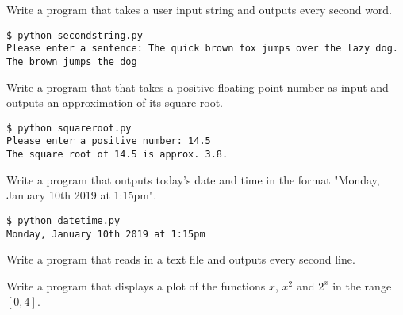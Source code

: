 \documentclass[a4paper, 12pt]{exam}
\begin{document}
\begin{questions}
    \question
    Write a program that takes a user input string and outputs every second word.
    \begin{verbatim}
$ python secondstring.py
Please enter a sentence: The quick brown fox jumps over the lazy dog.
The brown jumps the dog
    \end{verbatim}

    \question
    Write a program that that takes a positive floating point number as input and outputs an approximation of its square root.
    \begin{verbatim}
$ python squareroot.py
Please enter a positive number: 14.5
The square root of 14.5 is approx. 3.8.
    \end{verbatim}

    \question
    Write a program that outputs today's date and time in the format "Monday, January 10th 2019 at 1:15pm".
    \begin{verbatim}
$ python datetime.py
Monday, January 10th 2019 at 1:15pm
    \end{verbatim}

    \question
    Write a program that reads in a text file and outputs every second line.

    \question
    Write a program that displays a plot of the functions $x$, $x^2$ and $2^x$ in the range $[0, 4]$.

  \end{questions}
\end{document}
